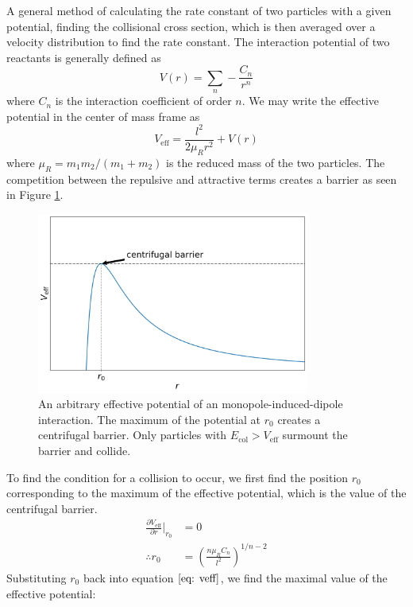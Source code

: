 A general method of calculating the rate constant of two particles with a given potential, finding the collisional cross section, which is then averaged over a velocity distribution to find the rate constant.\cite{Zhang2017} The interaction potential of two reactants is generally defined as
\begin{equation}
    V(r) = \sum_n - \frac{C_n}{r^n}
\end{equation}
where $C_n$ is the interaction coefficient of order $n$. We may write the effective potential in the center of mass frame as
\begin{equation}
    V_{\mathrm{eff}} = \frac{l^2}{2 \mu_R r^2} + V(r)\label{eq: veff}
\end{equation}
where $\mu_R=m_1 m_2/(m_1 + m_2)$ is the reduced mass of the two particles. The competition between the repulsive and attractive terms creates a barrier as seen in Figure \ref{fig: veff}.
\begin{figure}[H]
	\centering
	\includegraphics[width=0.8\textwidth]{images/v_eff.png}
	\caption{An arbitrary effective potential of an monopole-induced-dipole interaction. The maximum of the potential at $r_0$ creates a centrifugal barrier. Only particles with $E_{\mathrm{col}} > V_{\mathrm{eff}}$ surmount the barrier and collide.}
	\label{fig: veff}
\end{figure}
To find the condition for a collision to occur, we first find the position $r_0$ corresponding to the maximum of the effective potential, which is the value of the centrifugal barrier.
\begin{align*}
    \frac{\partial V_{\mathrm{eff}}}{\partial r}\bigg|_{r_0} & = 0 \\
    \therefore r_0 & = \left(\frac{n \mu_R C_n}{l^2}\right)^{1/n-2}
\end{align*}
Substituting $r_0$ back into equation $\ref{eq: veff}$, we find the maximal value of the effective potential:

